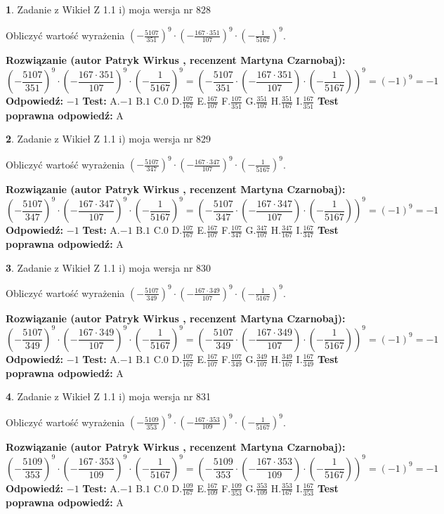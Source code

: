 \documentclass[12pt, a4paper]{article}
\theoremstyle{definition} %
\newtheorem{zad}{}
\newcommand{\zadStart}[1]{\begin{zad}#1\newline}
\newcommand{\zadStop}{\end{zad}}
\newcommand{\rozwStart}[2]{\noindent \textbf{Rozwiązanie (autor #1 , recenzent #2): }\newline}
\newcommand{\rozwStop}{\newline}
\newcommand{\odpStart}{\noindent \textbf{Odpowiedź:}\newline}
\newcommand{\odpStop}{\newline}
\newcommand{\testStart}{\noindent \textbf{Test:}\newline}
\newcommand{\testStop}{\newline}
\newcommand{\kluczStart}{\noindent \textbf{Test poprawna odpowiedź:}\newline}
\newcommand{\kluczStop}{\newline}
\begin{document}
\zadStart{Zadanie z Wikieł Z 1.1 i) moja wersja nr 828}

Obliczyć wartość wyrażenia $(-\frac{5107}{351})^{9} \cdot (-\frac{167 \cdot 351}{107})^{9} \cdot (-\frac{1}{5167})^{9}$.
\zadStop
\rozwStart{Patryk Wirkus}{Martyna Czarnobaj}
$$(-\frac{5107}{351})^{9} \cdot (-\frac{167 \cdot 351}{107})^{9} \cdot (-\frac{1}{5167})^{9} = (-\frac{5107}{351} \cdot (-\frac{167 \cdot 351}{107}) \cdot (-\frac{1}{5167}))^{9} = (-1)^{9} = -1$$
\rozwStop
\odpStart
$-1$
\odpStop
\testStart
A.$-1$ B.$1$ C.$0$ D.$\frac{107}{167}$ E.$\frac{167}{107}$
F.$\frac{107}{351}$ G.$\frac{351}{107}$
H.$\frac{351}{167}$
I.$\frac{167}{351}$
\testStop
\kluczStart
A
\kluczStop



\zadStart{Zadanie z Wikieł Z 1.1 i) moja wersja nr 829}

Obliczyć wartość wyrażenia $(-\frac{5107}{347})^{9} \cdot (-\frac{167 \cdot 347}{107})^{9} \cdot (-\frac{1}{5167})^{9}$.
\zadStop
\rozwStart{Patryk Wirkus}{Martyna Czarnobaj}
$$(-\frac{5107}{347})^{9} \cdot (-\frac{167 \cdot 347}{107})^{9} \cdot (-\frac{1}{5167})^{9} = (-\frac{5107}{347} \cdot (-\frac{167 \cdot 347}{107}) \cdot (-\frac{1}{5167}))^{9} = (-1)^{9} = -1$$
\rozwStop
\odpStart
$-1$
\odpStop
\testStart
A.$-1$ B.$1$ C.$0$ D.$\frac{107}{167}$ E.$\frac{167}{107}$
F.$\frac{107}{347}$ G.$\frac{347}{107}$
H.$\frac{347}{167}$
I.$\frac{167}{347}$
\testStop
\kluczStart
A
\kluczStop



\zadStart{Zadanie z Wikieł Z 1.1 i) moja wersja nr 830}

Obliczyć wartość wyrażenia $(-\frac{5107}{349})^{9} \cdot (-\frac{167 \cdot 349}{107})^{9} \cdot (-\frac{1}{5167})^{9}$.
\zadStop
\rozwStart{Patryk Wirkus}{Martyna Czarnobaj}
$$(-\frac{5107}{349})^{9} \cdot (-\frac{167 \cdot 349}{107})^{9} \cdot (-\frac{1}{5167})^{9} = (-\frac{5107}{349} \cdot (-\frac{167 \cdot 349}{107}) \cdot (-\frac{1}{5167}))^{9} = (-1)^{9} = -1$$
\rozwStop
\odpStart
$-1$
\odpStop
\testStart
A.$-1$ B.$1$ C.$0$ D.$\frac{107}{167}$ E.$\frac{167}{107}$
F.$\frac{107}{349}$ G.$\frac{349}{107}$
H.$\frac{349}{167}$
I.$\frac{167}{349}$
\testStop
\kluczStart
A
\kluczStop



\zadStart{Zadanie z Wikieł Z 1.1 i) moja wersja nr 831}

Obliczyć wartość wyrażenia $(-\frac{5109}{353})^{9} \cdot (-\frac{167 \cdot 353}{109})^{9} \cdot (-\frac{1}{5167})^{9}$.
\zadStop
\rozwStart{Patryk Wirkus}{Martyna Czarnobaj}
$$(-\frac{5109}{353})^{9} \cdot (-\frac{167 \cdot 353}{109})^{9} \cdot (-\frac{1}{5167})^{9} = (-\frac{5109}{353} \cdot (-\frac{167 \cdot 353}{109}) \cdot (-\frac{1}{5167}))^{9} = (-1)^{9} = -1$$
\rozwStop
\odpStart
$-1$
\odpStop
\testStart
A.$-1$ B.$1$ C.$0$ D.$\frac{109}{167}$ E.$\frac{167}{109}$
F.$\frac{109}{353}$ G.$\frac{353}{109}$
H.$\frac{353}{167}$
I.$\frac{167}{353}$
\testStop
\kluczStart
A
\kluczStop
\end{document}
